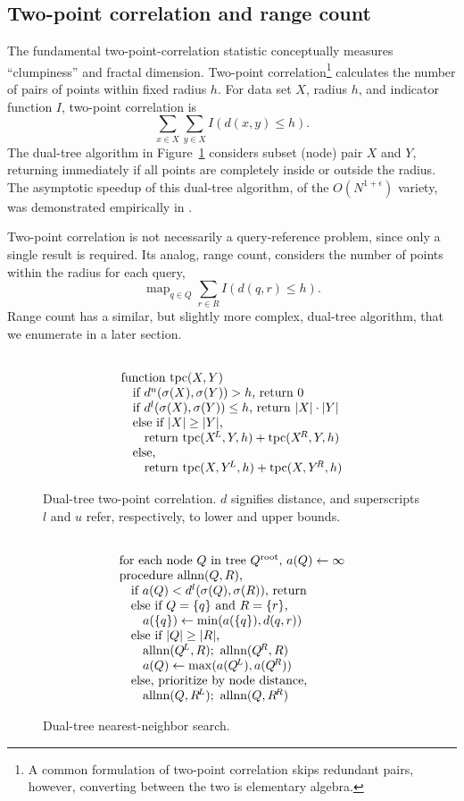 \documentclass[twoside,leqno,twocolumn]{article}
\DeclareMathOperator*{\map}{map}
\newcommand{\fig}[1]{Figure~\ref{fig:#1}}
\newcommand{\psty}{}
\newcommand{\X}{\\ \psty}
\newcommand{\x}{\X \hspace{0.13in}}
\newcommand{\xx}{\X \hspace{0.26in}}
\newcommand{\mysub}[1]{\subsection{#1} }
\newcommand{\kdroot}[1]{#1^{\text{root}}}
\newcommand{\kdleft}[1]{#1^{\!L}}
\newcommand{\kdright}[1]{#1^{\!R}}
\newcommand{\lo}[1]{#1^{l}}
\newcommand{\up}[1]{#1^{u}}
\newcommand{\distlo}{\lo{d}}
\newcommand{\distup}{\up{d}}
\newcommand{\dist}[2]{d(#1,#2)}
\newcommand{\outstat}{\sigma}
\begin{document}
\mysub{Two-point correlation and range count}
The fundamental two-point-correlation statistic conceptually measures ``clumpiness'' and fractal dimension.
Two-point correlation\footnote{A common formulation of two-point correlation skips redundant pairs, however, converting between the two is elementary algebra.} calculates the number of pairs of points within fixed radius $h$.
For data set $X$, radius $h$, and indicator function $I$, two-point correlation is
\[\sum_{x \in X} \sum_{y \in X} I(d(x, y) \leq h).\]
\noindent
The dual-tree algorithm in \fig{tpc} considers subset (node) pair $X$ and $Y$, returning immediately if all points are completely inside or outside the radius.
The asymptotic speedup of this dual-tree algorithm, of the $O(N^{1+\epsilon})$ variety, was demonstrated empirically in \cite{gray_nbody}.

Two-point correlation is not necessarily a query-reference problem, since only a single result is required.
Its analog, range count, considers the number of points within the radius for each query,
\[\map_{q \in Q} \sum_{r \in R} I(d(q, r) \leq h).\]
Range count has a similar, but slightly more complex, dual-tree algorithm, that we enumerate in a later section.

\begin{figure}[t]
  \begin{displaymath}
    \begin{array}[t]{l}
      \X \text{function tpc}(X, Y)
      \x \text{if }\distup(\outstat(X), \outstat(Y)) > h\text{, return }0
      \x \text{if }\distlo(\outstat(X), \outstat(Y)) \leq h\text{, return } |X| \cdot |Y|
      \x \text{else if }|X| \geq |Y|\text{,}
      \xx \text{return tpc}(\kdleft{X}, Y, h) + \text{tpc}(\kdright{X}, Y, h)
      \x \text{else,}
      \xx \text{return tpc}(X, \kdleft{Y}, h) + \text{tpc}(X, \kdright{Y}, h)
    \end{array}
  \end{displaymath}
  \caption{\label{fig:tpc} Dual-tree two-point correlation.
  $d$ signifies distance, and superscripts $l$ and $u$ refer, respectively, to lower and upper bounds.}
\end{figure}

\begin{figure}[t]
  \begin{displaymath}
   \begin{array}[t]{l}
     \X \text{for each node }Q\text{ in tree } \kdroot{Q}\text{, }a(Q) \gets \infty
     \X \text{procedure allnn}(Q,R)\text{,}
     \x \text{if }a(Q) < \distlo(\outstat(Q), \outstat(R))\text{, return}
     \x \text{else if }Q = \{q\} \text{ and } R = \{r\}\text{,}
     \xx a(\{q\}) \gets \min(a(\{q\}), \dist{q}{r})
     \x \text{else if }|Q| \geq |R|\text{,}
     \xx \text{allnn}(\kdleft{Q}, R); \text{ allnn}(\kdright{Q}, R)
     \xx a(Q) \gets \max(a(\kdleft{Q}), a(\kdright{Q}))
     \x \text{else, prioritize by node distance,}
     \xx \text{allnn}(Q, \kdleft{R}); \text{ allnn}(Q, \kdright{R})
   \end{array}
  \end{displaymath}
  \caption{\label{fig:allnn} Dual-tree nearest-neighbor search.}
\end{figure}
\end{document}
